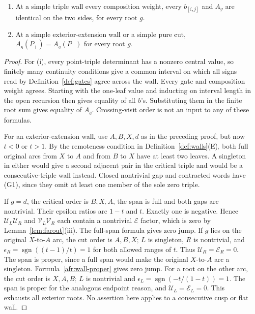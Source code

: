 \begin{theorem}\label{thm:A-R3E}\leanok
\begin{enumerate}
\item[(i)] At a simple triple wall every composition weight, every
$b_{[i,j]}$ and $A_g$ are identical on the two sides, for every root $g$.
\item[(ii)] At a simple exterior-extension wall or a simple pure cut,
$A_g(P_+)=A_g(P_-)$ for every root $g$.
\end{enumerate}

\end{theorem}
\begin{proof}\leanok{}
For (i), every point-triple determinant has a nonzero central value,
so finitely many continuity conditions give a common interval on
which all signs read by Definition~\ref{def:gates} agree across the
wall. Every gate and composition weight agrees. Starting with the
one-leaf value and inducting on interval length in the open recursion
then gives equality of all $b$'s. Substituting them in the finite root
sum gives equality of $A_g$. Crossing-visit order is not an input to
any of these formulas.

For an exterior-extension wall, use $A,B,X,d$ as in the preceding
proof, but now $t<0$ or $t>1$. By the remoteness condition in
Definition~\ref{def:walls}(E), both full original arcs from $X$ to
$A$ and from $B$ to $X$ have at least two leaves. A singleton in
either would give a second adjacent pair in the critical triple and
would be a consecutive-triple wall instead. Closed nontrivial gap
and contracted words have (G1), since they omit at least one member
of the sole zero triple.

If $g=d$, the critical order is $B,X,A$, the span is full and both
gaps are nontrivial. Their epsilon ratios are $1-t$ and $t$.
Exactly one is negative. Hence $\mathcal U_L\mathcal U_R$ and
$\mathcal V_L\mathcal V_R$ each contain a nontrivial $\mathcal E$
factor, which is zero by Lemma~\ref{lem:farout}(iii).
The full-span formula gives zero jump.
If $g$ lies on the original $X$-to-$A$ arc, the cut order is $A,B,X$;
$L$ is singleton, $R$ is nontrivial, and
$\epsilon_R=\operatorname{sgn}((t-1)/t)=1$ for both allowed ranges
of $t$. Thus $\mathcal U_R=\mathcal E_R=0$. The span is proper,
since a full span would make the original $X$-to-$A$ arc a singleton.
Formula~\eqref{afr:wall-proper} gives zero jump.
For a root on the other arc, the cut order is $X,A,B$; $L$ is
nontrivial and $\epsilon_L=\operatorname{sgn}(-t/(1-t))=1$.
The span is proper for the analogous endpoint reason, and
$\mathcal U_L=\mathcal E_L=0$. This exhausts all exterior roots.
No assertion here applies to a consecutive cusp or flat wall.


\end{proof}
